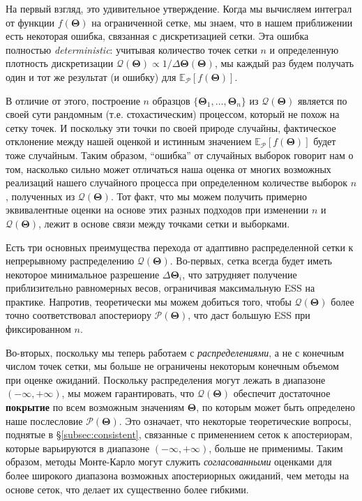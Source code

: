 \documentclass[12pt, titlepage]{article}
\newcommand{\meanwrt}[2]{\ensuremath{\mathbb{E}_{{#2}}\left[{#1}\right]}}
\newcommand{\params}{\ensuremath{\boldsymbol\Theta}}
\newcommand{\posterior}{\ensuremath{\mathcal{P}}}
\newcommand{\proposal}{\ensuremath{\mathcal{Q}}}
\begin{document}
На первый взгляд, это удивительное утверждение. Когда мы вычисляем интеграл от функции $f(\params)$ на ограниченной сетке, мы знаем, что в нашем приближении есть некоторая ошибка, связанная с дискретизацией сетки. Эта ошибка полностью \textit{deterministic}: учитывая количество точек сетки $n$ и определенную плотность дискретизации $\proposal(\params)\propto 1/\Delta\params(\params)$, мы каждый раз будем получать один и тот же результат (и ошибку) для $\meanwrt{f(\params)}{\posterior}$.

В отличие от этого, построение $n$ образцов $\{\params_1,\dots,\params_n\}$ из $\proposal(\params)$ является по своей сути рандомным (т.е. стохастическим) процессом, который не похож на сетку точек. И поскольку эти точки по своей природе случайны, фактическое отклонение между нашей оценкой и истинным значением $\meanwrt{f(\params)}{\posterior}$ будет тоже случайным. Таким образом, ``ошибка'' от случайных выборок говорит нам о том, насколько сильно может отличаться наша оценка от многих возможных реализаций нашего случайного процесса при определенном количестве выборок $n$, полученных из $\proposal(\params)$. Тот факт, что мы можем получить примерно эквивалентные оценки на основе этих разных подходов при изменении $n$ и $\proposal(\params)$, лежит в основе связи между точками сетки и выборками.

Есть три основных преимущества перехода от адаптивно распределенной сетки к непрерывному распределению $\proposal(\params)$. Во-первых, сетка всегда будет иметь некоторое минимальное разрешение $\Delta \params_i$, что затрудняет получение приблизительно равномерных весов, ограничивая максимальную ESS на практике. Напротив, теоретически мы можем добиться того, чтобы $\proposal(\params)$ более точно соответствовал апостериору $\posterior(\params)$, что даст большую ESS при фиксированном $n$.

Во-вторых, поскольку мы теперь работаем с \textit{распределениями}, а не с конечным числом точек сетки, мы больше не ограничены некоторым конечным объемом при оценке ожиданий. Поскольку распределения могут лежать в диапазоне $(-\infty, +\infty)$, мы можем гарантировать, что $\proposal(\params)$ обеспечит достаточное \textbf{покрытие} по всем возможным значениям $\params$, по которым может быть определено наше послесловие $\posterior(\params)$. Это означает, что некоторые теоретические вопросы, поднятые в \S\ref{subsec:consistent}, связанные с применением сеток к апостериорам, которые варьируются в диапазоне $(-\infty, +\infty)$, больше не применимы. Таким образом, методы Монте-Карло могут служить \textit{согласованными} оценками для более широкого диапазона возможных апостериорных ожиданий, чем методы на основе сеток, что делает их существенно более гибкими.
\end{document}
